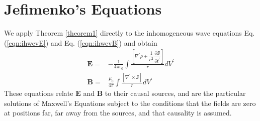 \documentclass[11pt]{article}              %
\begin{document}
\section[Jefimenko's Equations]{Jefimenko's Equations
   }\label{section2.2}
We apply Theorem \ref{theorem1} directly to the inhomogeneous wave equations Eq. (\ref{eqn:ihwevE}) and Eq. (\ref{eqn:ihwevB}) and obtain
\begin{align}
    {\mathbf E}=&-\frac{1}{4\pi\epsilon_0}\int\frac{\left[\nabla^\prime\rho+\dfrac{1}{c^2}\dfrac{\partial {\mathbf J}}{\partial t^\prime}\right]}{r}dV^\prime\label{eqn:retardedE}\\
    {\mathbf B}=&\frac{\mu_0}{4\pi}\int\frac{[\nabla^\prime\times{\mathbf J}]}{r}dV^\prime\label{eqn:retardedB}
\end{align}
These equations relate ${\mathbf E}$ and ${\mathbf B}$ to their causal sources, and are the particular solutions of Maxwell's Equations subject to the conditions that the fields are zero at positions far, far away from the sources, and that causality is assumed. 
\end{document}
